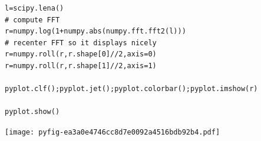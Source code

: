 \documentclass{report}
\begin{document}
\begin{lstlisting}
l=scipy.lena()
# compute FFT
r=numpy.log(1+numpy.abs(numpy.fft.fft2(l)))
# recenter FFT so it displays nicely
r=numpy.roll(r,r.shape[0]//2,axis=0)
r=numpy.roll(r,r.shape[1]//2,axis=1)

pyplot.clf();pyplot.jet();pyplot.colorbar();pyplot.imshow(r)

pyplot.show()

\end{lstlisting}















\noindent
\texttt{[image: pyfig-ea3a0e4746cc8d7e0092a4516bdb92b4.pdf]}
\end{document}
